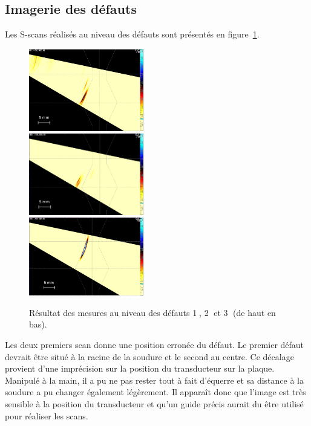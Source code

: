 \documentclass[twoside]{article}
\begin{document}
\begin{multicols}{2}
\subsection{Imagerie des défauts}

Les S-scans réalisés au niveau des défauts sont présentés en figure~\ref{resultat}. 


\begin{figure}[H]
	\centering
	\includegraphics[width=5cm]{images/def1.png}\\
	\includegraphics[width=5cm]{images/def2.png}\\
	\includegraphics[width=5cm]{images/def3.png}\\
	\caption{\label{resultat} Résultat des mesures au niveau des défauts \textcircled{\footnotesize 1}, \textcircled{\footnotesize 2} et \textcircled{\footnotesize 3} (de haut en bas).}
\end{figure}

Les deux premiers scan donne une position erronée du défaut. Le premier défaut devrait être situé à la racine de la soudure et le second au centre. Ce décalage provient d'une imprécision sur la position du transducteur sur la plaque. Manipulé à la main, il a pu ne pas rester tout à fait d'équerre et sa distance à la soudure a pu changer également légèrement. Il apparaît donc que l'image est très sensible à la position du transducteur et qu'un guide précis aurait du être utilisé pour réaliser les scans.





\end{multicols}
\end{document}
